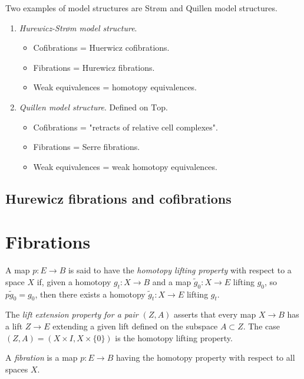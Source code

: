 \medskip\noindent
Two examples of model structures
are Str\o m and Quillen model structures.

\begin{example}
\label{example-two-inter-model-categ-struc}
\begin{enumerate}
\item {\it Hurewicz-Str\o m model structure}.
\begin{itemize}
\item Cofibrations = Huerwicz cofibrations.
\item Fibrations = Hurewicz fibrations.
\item Weak equivalences = homotopy
equivalences.
\end{itemize}
\item {\it Quillen model structure}. Defined
on $\text{Top}$.
\begin{itemize}
\item Cofibrations = "retracts of relative
cell complexes".
\item Fibrations = Serre fibrations.
\item Weak equivalences = weak homotopy
equivalences.
\end{itemize}
\end{enumerate}
\end{example}

\subsection{Hurewicz fibrations and
cofibrations}
\label{subsection-hurew-fibra-cofib}

\section{Fibrations}
\label{section-fibrations}

\begin{definition}[Hatcher]
\label{definition-hatcher}
A map $p:E\to B$ is said to have the {\it
homotopy lifting property} with respect to a
space $X$ if, given a homotopy $g_t:X\to B$
and a map $\tilde{g}_0:X\to E$ lifting $g_0$,
so $p\tilde{g}_0=g_0$, then there exists a
homotopy $\tilde{g}_t:X\to E$ lifting $g_t$.

The {\it lift extension property for a pair
$(Z,A)$} asserts that every map $X\to B$ has
a lift $Z\to E$ extending a given lift
defined on the subspace $A\subset Z$. The
case $(Z,A)=(X\times I,X\times\{0\})$ is the
homotopy lifting property.

A {\it fibration} is a map $p:E\to B$ having
the homotopy property with respect to all
spaces $X$.
\end{definition}


